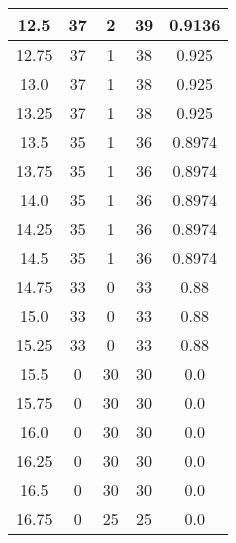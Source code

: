 \documentclass[letterpaper, 12pt]{article}
\begin{document}
\begin{longtable}{|c|c|c|c|c|}
12.5 & 37 & 2 & 39 & 0.9136 \\
\hline
12.75 & 37 & 1 & 38 & 0.925 \\
\hline
13.0 & 37 & 1 & 38 & 0.925 \\
\hline
13.25 & 37 & 1 & 38 & 0.925 \\
\hline
13.5 & 35 & 1 & 36 & 0.8974 \\
\hline
13.75 & 35 & 1 & 36 & 0.8974 \\
\hline
14.0 & 35 & 1 & 36 & 0.8974 \\
\hline
14.25 & 35 & 1 & 36 & 0.8974 \\
\hline
14.5 & 35 & 1 & 36 & 0.8974 \\
\hline
14.75 & 33 & 0 & 33 & 0.88 \\
\hline
15.0 & 33 & 0 & 33 & 0.88 \\
\hline
15.25 & 33 & 0 & 33 & 0.88 \\
\hline
15.5 & 0 & 30 & 30 & 0.0 \\
\hline
15.75 & 0 & 30 & 30 & 0.0 \\
\hline
16.0 & 0 & 30 & 30 & 0.0 \\
\hline
16.25 & 0 & 30 & 30 & 0.0 \\
\hline
16.5 & 0 & 30 & 30 & 0.0 \\
\hline
16.75 & 0 & 25 & 25 & 0.0 \\
\hline
\end{longtable}
\end{document}
